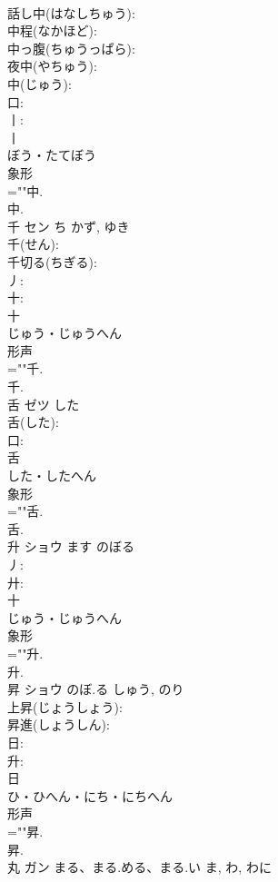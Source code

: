 \documentclass[8pt]{extreport}
\begin{document}
\begin{CJK}{UTF8}{min}
\\	話し中(はなしちゅう): 
\\	中程(なかほど): 
\\	中っ腹(ちゅうっぱら): 
\\	夜中(やちゅう): 
\\	中(じゅう): 
\\	口: 
\\	丨: 
\\	丨	
\\	ぼう・たてぼう	
\\	象形 
\\	=""中.
\\	中.
\\	千	セン	ち	かず, ゆき	
\\	千(せん): 
\\	千切る(ちぎる): 
\\	丿: 
\\	十: 
\\	十	
\\	じゅう・じゅうへん	
\\	形声 
\\	=""千.
\\	千.
\\	舌	ゼツ	した		
\\	舌(した): 
\\	口: 
\\	舌	
\\	した・したへん	
\\	象形 
\\	=""舌.
\\	舌.
\\	升	ショウ	ます	のぼる	
\\	丿: 
\\	廾: 
\\	十	
\\	じゅう・じゅうへん	
\\	象形 
\\	=""升.
\\	升.
\\	昇	ショウ	のぼ.る	しゅう, のり	
\\	上昇(じょうしょう): 
\\	昇進(しょうしん): 
\\	日: 
\\	升: 
\\	日	
\\	ひ・ひへん・にち・にちへん	
\\	形声 
\\	=""昇.
\\	昇.
\\	丸	ガン	まる、まる.める、まる.い	ま, わ, わに	

\end{CJK}
\end{document}
